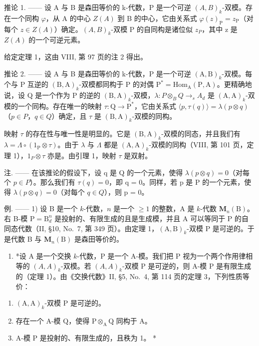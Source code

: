 推论 1. —— 设 A 与 B 是森田等价的 k-代数，P 是一个可逆 \((A,B)_{k}\)-双模。存在一个同构 \(\varphi\)，从 A 的中心 \(Z(A)\) 到 B 的中心，它由关系式 \(\varphi(z)_{\mathrm{P}} = z_{\mathrm{P}}\)（对每个 \(z \in Z(A)\)）确定。\((A,B)_{k}\)-双模 P 的自同构是诸位似 \(z_{P}\)，其中 z 是 \(Z(A)\) 的一个可逆元素。

给定定理 1，这由 VIII, 第 97 页的注 2 得出。

推论 2. —— 设 A 与 B 是森田等价的 k-代数，P 是一个可逆 \((\mathrm{A},\mathrm{B})_{k}\)-双模。每个与 P 互逆的 \((\mathrm{B},\mathrm{A})_{k}\)-双模都同构于 P 的对偶 \(\mathrm{P}^{*}=\mathrm{Hom}_{\mathrm{A}}(\mathrm{P},\mathrm{A})\)。更精确地说，设 Q 是一个作为 P 的逆的 \((\mathrm{B},\mathrm{A})_{k}\)-双模，\(\lambda:P\otimes_{B}Q\to_{s}A_{d}\) 是 \((\mathrm{A},\mathrm{A})_{k}\)-双模的一个同构。存在唯一的映射 \(\tau:\mathrm{Q}\to\mathrm{P}^{*}\)，它由关系式 \(\langle p,\tau(q)\rangle=\lambda(p\otimes q)\)（\(p\in P\)，\(q\in Q\)）确定，且 \(\tau\) 是 \((\mathrm{B},\mathrm{A})_{k}\)-双模的同构。

映射 \(\tau\) 的存在性与唯一性是明显的。它是 \((\mathrm{B},\mathrm{A})_{k}\)-双模的同态，并且我们有 \(\lambda=\Lambda\circ(1_{\mathrm{P}}\otimes\tau)\)。由于 \(\lambda\) 与 \(\Lambda\) 都是 \((\mathrm{A},\mathrm{A})_{k}\)-双模的同构（VIII, 第 101 页，定理 1），\(1_{P}\otimes\tau\) 亦是。由引理 1，映射 \(\tau\) 是双射。

注. —— 在该推论的假设下，设 q 是 Q 的一个元素，使得 \(\lambda(p \otimes q) = 0\)（对每个 \(p \in P\)）。那么我们有 \(\tau(q) = 0\)，即 q = 0。同样，若 p 是 P 的一个元素，使得 \(\lambda(p \otimes q) = 0\)（对每个 \(q \in Q\)），则 p = 0。

例. —— 1) 设 B 是一个 \(k\)-代数，\(n\) 是一个 \(\geqslant 1\) 的整数，A 是 \(k\)-代数 \(\mathbf{M}_n(\mathrm{B})\)。右 B-模 \(\mathrm{P} = \mathrm{B}_d^n\) 是投射的、有限生成的且是生成模，并且 A 可以等同于 P 的自同态代数（II, §10, No.~7, 第 349 页）。由定理 1，\((\mathrm{A},\mathrm{B})_k\)-双模 P 是可逆的。于是代数 B 与 \(\mathbf{M}_n(\mathrm{B})\) 是森田等价的。

\begin{enumerate}
\def\labelenumi{\arabic{enumi})}
\setcounter{enumi}{1}
\tightlist
\item
  *设 A 是一个交换 \(k\)-代数，P 是一个 A-模。我们把 P 视为一个两个作用律相等的 \((A, A)_k\)-双模。若 \((A, A)_k\)-双模 P 是可逆的，则 A-模 P 是有限生成的（定理 1）。由《交换代数》II, §5, No.~4, 第 114 页的定理 3，下列性质等价：
\end{enumerate}

\begin{enumerate}
\def\labelenumi{(\roman{enumi})}
\item
  \((\mathrm{A},\mathrm{A})_{k}\)-双模 P 是可逆的。
\item
  存在一个 A-模 \(\mathrm{Q}\)，使得 \(\mathrm{P} \otimes_{\mathrm{A}} \mathrm{Q}\) 同构于 \(\mathrm{A}\)。
\item
  A-模 P 是投射的、有限生成的，且秩为 1。 *
\end{enumerate}

